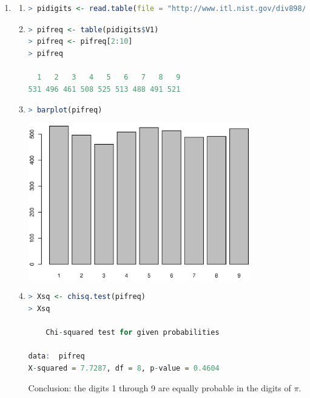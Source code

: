 \documentclass{article}
\begin{document}
\begin{enumerate}[leftmargin = 0 em, label = \arabic*., font = \bfseries]
	\item \begin{enumerate}
\item 
\begin{lstlisting}[language = R]
> pidigits <- read.table(file = "http://www.itl.nist.gov/div898/strd/univ/data/PiDigits.dat", skip = 60)
\end{lstlisting}

\item 
\begin{lstlisting}[language = R]
> pifreq <- table(pidigits$V1)
> pifreq <- pifreq[2:10]
> pifreq

  1   2   3   4   5   6   7   8   9 
531 496 461 508 525 513 488 491 521 

\end{lstlisting}

\item 
\begin{lstlisting}[language = R]
> barplot(pifreq)
\end{lstlisting}

\begin{center}
\includegraphics[width = 0.8\textwidth]{barplot.eps}
\end{center}

\item 
\begin{lstlisting}[language = R]
> Xsq <- chisq.test(pifreq)
> Xsq

	Chi-squared test for given probabilities

data:  pifreq
X-squared = 7.7287, df = 8, p-value = 0.4604
\end{lstlisting}

Conclusion: the digits 1 through 9 are equally probable in the digits of $\pi$.
	\end{enumerate}


\end{enumerate}
\end{document}
